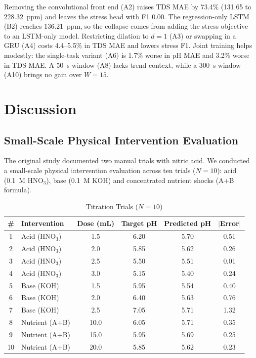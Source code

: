 Removing the convolutional front end (A2) raises TDS MAE by 73.4\% (131.65 to 228.32~ppm) and leaves the stress head with F1 0.00. The regression-only LSTM (B2) reaches 136.21~ppm, so the collapse comes from adding the stress objective to an LSTM-only model. Restricting dilation to $d=1$ (A3) or swapping in a GRU (A4) costs 4.4--5.5\% in TDS MAE and lowers stress F1. Joint training helps modestly: the single-task variant (A6) is 1.7\% worse in pH MAE and 3.2\% worse in TDS MAE. A 50~s window (A8) lacks trend context, while a 300~s window (A10) brings no gain over $W=15$.

\section{Discussion}\label{sec:discussion}

\subsection{Small-Scale Physical Intervention Evaluation}
The original study documented two manual trials with nitric acid. We conducted a small-scale physical intervention evaluation across ten trials ($N=10$): acid (0.1~M HNO$_3$), base (0.1~M KOH) and concentrated nutrient shocks (A+B formula).

\begin{table}[t]
\caption{Titration Trials ($N=10$)}
\label{tab:titration}
\centering
\scriptsize
\setlength{\tabcolsep}{4pt}
\begin{tabular}{clcccc}
\toprule
\# & Intervention & Dose (mL) & Target pH & Predicted pH & $|$Error$|$ \\
\midrule
1  & Acid (HNO$_3$) & 1.5  & 6.20 & 5.70 & 0.51 \\
2  & Acid (HNO$_3$) & 2.0  & 5.85 & 5.62 & 0.26 \\
3  & Acid (HNO$_3$) & 2.5  & 5.50 & 5.51 & 0.01 \\
4  & Acid (HNO$_3$) & 3.0  & 5.15 & 5.40 & 0.24 \\
5  & Base (KOH)     & 1.5  & 5.95 & 5.54 & 0.40 \\
6  & Base (KOH)     & 2.0  & 6.40 & 5.63 & 0.76 \\
7  & Base (KOH)     & 2.5  & 7.05 & 5.71 & 1.32 \\
8  & Nutrient (A+B) & 10.0 & 6.05 & 5.71 & 0.35 \\
9  & Nutrient (A+B) & 15.0 & 5.95 & 5.69 & 0.25 \\
10 & Nutrient (A+B) & 20.0 & 5.85 & 5.62 & 0.23 \\
\bottomrule
\end{tabular}
\end{table}

